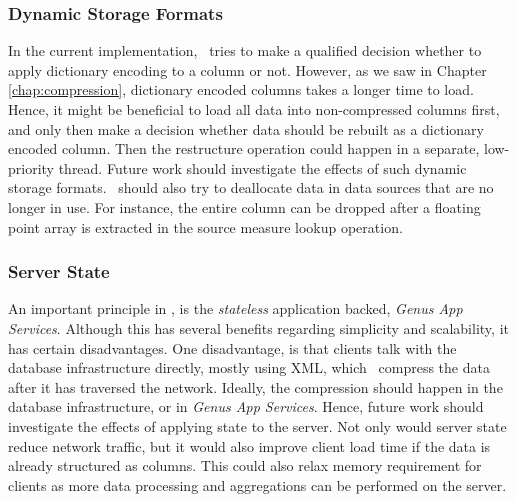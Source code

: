 \subsubsection{Dynamic Storage Formats}
\label{ssub:Dynamic Storage Formats}
In the current implementation, \gap~tries to make a qualified decision whether to apply dictionary encoding to a column or not. However, as we saw in Chapter \ref{chap:compression}, dictionary encoded columns takes a longer time to load. Hence, it might be beneficial to load all data into non-compressed columns first, and only then make a decision whether data should be rebuilt as a dictionary encoded column. Then the restructure operation could happen in a separate, low-priority thread. Future work should investigate the effects of such dynamic storage formats. \gap~should also try to deallocate data in data sources that are no longer in use. For instance, the entire column can be dropped after a floating point array is extracted in the source measure lookup operation.

\subsubsection{Server State}
\label{ssub:Server State}
An important principle in \gap, is the \textit{stateless} application backed, \textit{Genus App Services}. Although this has several benefits regarding simplicity and scalability, it has certain disadvantages. One disadvantage, is that clients talk with the database infrastructure directly, mostly using XML, which \gap~compress the data after it has traversed the network. Ideally, the compression should happen in the database infrastructure, or in \textit{Genus App Services}. Hence, future work should investigate the effects of applying state to the server. Not only would server state reduce network traffic, but it would also improve client load time if the data is already structured as columns. This could also relax memory requirement for clients as more data processing and aggregations can be performed on the server.
